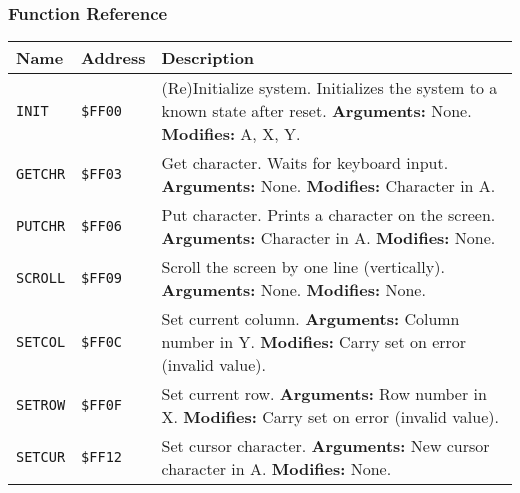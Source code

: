 \documentclass[a4paper,10pt,oneside]{article}
\begin{document}
\subsubsection*{Function Reference}
\begin{tabularx}{\textwidth}{l | l | X }
  \textbf{Name} & \textbf{Address} & \textbf{Description} \\ \hline
  
  \texttt{INIT} & \texttt{\$FF00} & 
  (Re)Initialize system. 
  \newline Initializes the system to a known state after reset.
  \newline \textbf{Arguments:} None.
  \newline \textbf{Modifies:} A, X, Y.  \\ \hline

  \texttt{GETCHR} & \texttt{\$FF03} &
  Get character. Waits for keyboard input.
  \newline \textbf{Arguments:} None.
  \newline \textbf{Modifies:} Character in A. \\ \hline

  \texttt{PUTCHR} & \texttt{\$FF06} &
  Put character. Prints a character on the screen.
  \newline \textbf{Arguments:} Character in A.
  \newline \textbf{Modifies:} None. \\ \hline

  \texttt{SCROLL} & \texttt{\$FF09} &
  Scroll the screen by one line (vertically).
  \newline \textbf{Arguments:} None.
  \newline \textbf{Modifies:} None. \\ \hline

  \texttt{SETCOL} & \texttt{\$FF0C} &
  Set current column.
  \newline \textbf{Arguments:} Column number in Y.
  \newline \textbf{Modifies:} Carry set on error (invalid value). \\ \hline

  \texttt{SETROW} & \texttt{\$FF0F} &
  Set current row.
  \newline \textbf{Arguments:} Row number in X.
  \newline \textbf{Modifies:} Carry set on error (invalid value). \\ \hline

  \texttt{SETCUR} & \texttt{\$FF12} &
  Set cursor character.
  \newline \textbf{Arguments:} New cursor character in A.
  \newline \textbf{Modifies:} None. \\ \hline


\end{tabularx}
\end{document}
